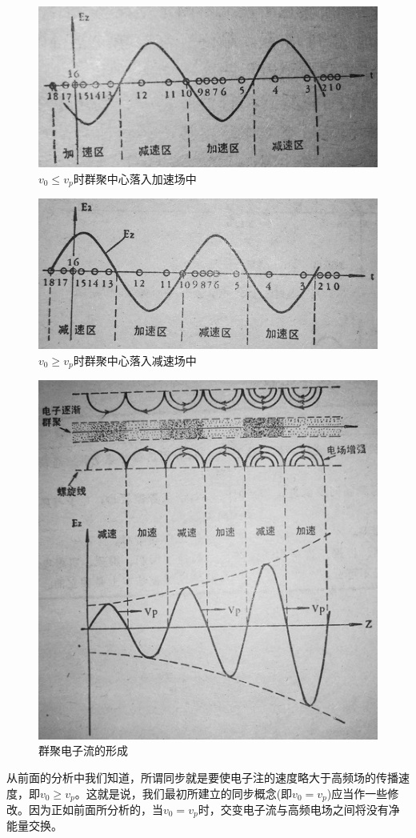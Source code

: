 \begin{figure}[phtb]
	\centering
	\includegraphics[width=0.6\linewidth]{figure/ch2-6}
	\caption{$ v_0 \leq v_p $时群聚中心落入加速场中}
	\label{ch2-6}
\end{figure}

\begin{figure}[phtb]
	\centering
	\includegraphics[width=0.6\linewidth]{figure/ch2-7}
	\caption{$ v_0 \geq v_p $时群聚中心落入减速场中}
	\label{ch2-7}
\end{figure}
\begin{figure}[phtb]
	\centering
	\includegraphics[width=0.65\linewidth]{figure/ch2-8}
	\caption{群聚电子流的形成}
	\label{ch2-8}
\end{figure}
从前面的分析中我们知道，所谓同步就是要使电子注的速度略大于高频场的传播速度，即$ v_0 \geq v_p $。这就是说，我们最初所建立的同步概念(即$ v_0 = v_p $)应当作一些修改。因为正如前面所分析的，当$ v_0 = v_p $时，交变电子流与高频电场之间将没有净能量交换。

